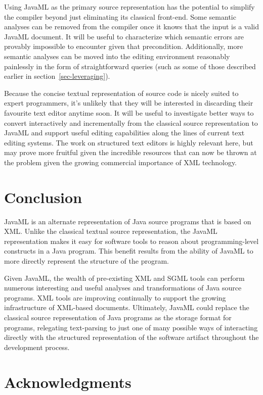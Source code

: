 \documentclass{article}
\begin{document}
\begin{multicols}{2}
Using JavaML as the primary source representation has the potential to
simplify the compiler beyond just eliminating its classical front-end.
Some semantic analyses can be removed from the compiler once it knows
that the input is a valid JavaML document.  It will be useful to
characterize which semantic errors are provably impossible to encounter
given that precondition.  Additionally, more semantic analyses can be
moved into the editing environment reasonably painlessly in the form of
straightforward queries (such as some of those described earlier in
section~\ref{sec-leveraging}).

Because the concise textual representation of source code is nicely
suited to expert programmers, it's unlikely that they will be interested
in discarding their favourite text editor anytime soon.  It will be
useful to investigate better ways to convert interactively and
incrementally from the classical source representation to JavaML and
support useful editing capabilities along the lines of current text
editing systems.  The work on structured text editors is highly relevant
here, but may prove more fruitful given the incredible resources that
can now be thrown at the problem given the growing commercial importance
of XML technology.

\section{Conclusion}
\label{sec-conclusion}

JavaML is an alternate representation of Java source programs that is
based on XML.  Unlike the classical textual source representation, the
JavaML representation makes it easy for software tools to reason about
programming-level constructs in a Java program.  This benefit results from the
ability of JavaML to more directly represent the structure of the program.

Given JavaML, the wealth of pre-existing XML and SGML tools can perform
numerous interesting and useful analyses and transformations of Java
source programs.  XML tools are improving continually to support the
growing infrastructure of XML-based documents.  Ultimately, JavaML could
replace the classical source representation of Java programs as the
storage format for programs, relegating text-parsing to just one of many
possible ways of interacting directly with the structured representation
of the software artifact throughout the development process.

\section*{Acknowledgments}
\label{sec-ack}


\end{multicols}
\end{document}
